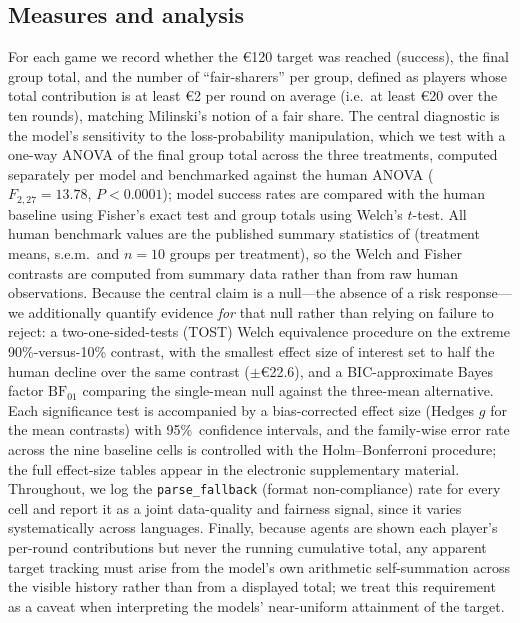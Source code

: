 \subsection{Measures and analysis}
For each game we record whether the €120 target was reached (success), the final group total, and the number of ``fair-sharers'' per group, defined as players whose total contribution is at least €2 per round on average (i.e.\ at least €20 over the ten rounds), matching Milinski's notion of a fair share. The central diagnostic is the model's sensitivity to the loss-probability manipulation, which we test with a one-way ANOVA of the final group total across the three treatments, computed separately per model and benchmarked against the human ANOVA ($F_{2,27}=13.78$, $P<0.0001$); model success rates are compared with the human baseline using Fisher's exact test and group totals using Welch's $t$-test. All human benchmark values are the published summary statistics of \textcite{milinski2008climate} (treatment means, s.e.m.\ and $n=10$ groups per treatment), so the Welch and Fisher contrasts are computed from summary data rather than from raw human observations. Because the central claim is a null---the absence of a risk response---we additionally quantify evidence \emph{for} that null rather than relying on failure to reject: a two-one-sided-tests (TOST) Welch equivalence procedure \parencite{lakens2018equivalence} on the extreme 90\%-versus-10\% contrast, with the smallest effect size of interest set to half the human decline over the same contrast ($\pm$€22.6), and a BIC-approximate Bayes factor $\mathrm{BF}_{01}$ \parencite{wagenmakers2007practical} comparing the single-mean null against the three-mean alternative. Each significance test is accompanied by a bias-corrected effect size (Hedges $g$ for the mean contrasts) with 95\%\ confidence intervals, and the family-wise error rate across the nine baseline cells is controlled with the Holm--Bonferroni procedure; the full effect-size tables appear in the electronic supplementary material. Throughout, we log the \texttt{parse\_fallback} (format non-compliance) rate for every cell and report it as a joint data-quality and fairness signal, since it varies systematically across languages. Finally, because agents are shown each player's per-round contributions but never the running cumulative total, any apparent target tracking must arise from the model's own arithmetic self-summation across the visible history rather than from a displayed total; we treat this requirement as a caveat when interpreting the models' near-uniform attainment of the target.

